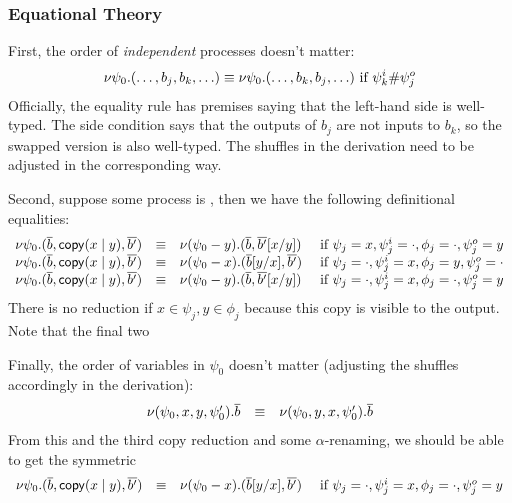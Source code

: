 \documentclass{article}
\newcommand\deq{\ensuremath{\equiv}}
\begin{document}
\subsubsection{Equational Theory}

First, the order of \emph{independent} processes doesn't matter:
\[
\cut{\psi_0}{(\ldots,b_j,b_k,\ldots)} \deq \cut{\psi_0}{(\ldots,b_k,b_j,\ldots)} 
\text{ if } \psi^i_k \# \psi^o_j
\]
Officially, the equality rule has premises saying that the left-hand
side is well-typed.  The side condition says that the outputs of $b_j$
are not inputs to $b_k$, so the swapped version is also well-typed.  The
shuffles in the derivation need to be adjusted in the corresponding
way.  

Second, suppose some process
 is , then we have
the following definitional equalities:
\[
\begin{array}{rcll}
\cut{\psi_0}{(\lst{b},\cpy{x}{y},\lst{b'})} & \deq & \cut{(\psi_0-y)}{(\lst{b},\lst{b'}[x/y])} & \text{ if } \psi_j = x, \psi_j^i = \cdot, \phi_j = \cdot, \psi_j^o = y\\
\cut{\psi_0}{(\lst{b},\cpy{x}{y},\lst{b'})} & \deq & \cut{(\psi_0-x)}{(\lst{b}[y/x],\lst{b'})} & \text{ if } \psi_j = \cdot, \psi_j^i = x, \phi_j = y, \psi_j^o = \cdot\\
\cut{\psi_0}{(\lst{b},\cpy{x}{y},\lst{b'})} & \deq & \cut{(\psi_0-y)}{(\lst{b},\lst{b'}[x/y])} & \text{ if } \psi_j = \cdot, \psi_j^i = x, \phi_j = \cdot, \psi_j^o = y\\
\end{array}
\]
There is no reduction if $x \in \psi_j,y \in \phi_j$ because this copy
is visible to the output.  Note that the final two 

Finally, the order of variables in $\psi_0$ doesn't matter (adjusting
the shuffles accordingly in the derivation): 
\[
\begin{array}{rcll}
\cut{(\psi_0,x,y,\psi_0')}{\lst{b}} & \deq & \cut{(\psi_0,y,x,\psi_0')}{\lst{b}}
\end{array}
\]
From this and the third copy reduction and some $\alpha$-renaming,
we should be able to get the symmetric
\[
\begin{array}{rcll}
\cut{\psi_0}{(\lst{b},\cpy{x}{y},\lst{b'})} & \deq & \cut{(\psi_0-x)}{(\lst{b}[y/x],\lst{b'})} & \text{ if } \psi_j = \cdot, \psi_j^i = x, \phi_j = \cdot, \psi_j^o = y\\
\end{array}
\]
\end{document}
